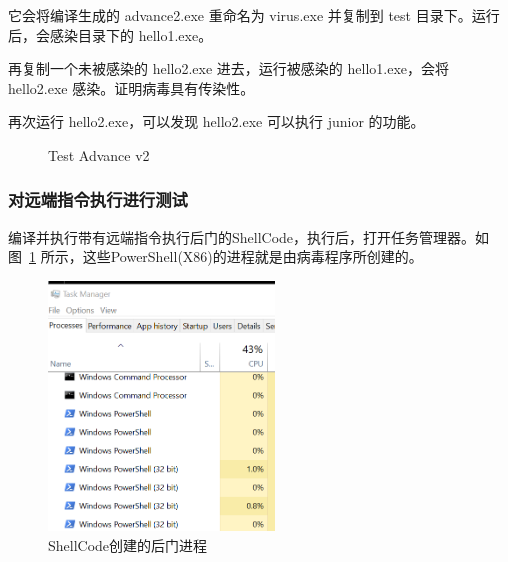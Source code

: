 \documentclass[UTF8]{ctexart}
\begin{document}
    它会将编译生成的 advance2.exe 重命名为 virus.exe 并复制到 test 目录下。运行后，会感染目录下的 hello1.exe。
    
    再复制一个未被感染的 hello2.exe 进去，运行被感染的 hello1.exe，会将 hello2.exe 感染。证明病毒具有传染性。
    
    再次运行 hello2.exe，可以发现 hello2.exe 可以执行 junior 的功能。

    \begin{figure}[H]
    \centering
        \caption{Test Advance v2}
    \end{figure}
    
    \subsubsection{对远端指令执行进行测试}
    
    编译并执行带有远端指令执行后门的ShellCode，执行后，打开任务管理器。如图~\ref{fig:backdoor-test} 所示，这些PowerShell(X86)的进程就是由病毒程序所创建的。
    
    \begin{figure}[H]
        \centering
        \includegraphics[width=6cm]{.asset/backdoor-test.png}
        \caption{ShellCode创建的后门进程}
        \label{fig:backdoor-test}
    \end{figure}
    
\end{document}
